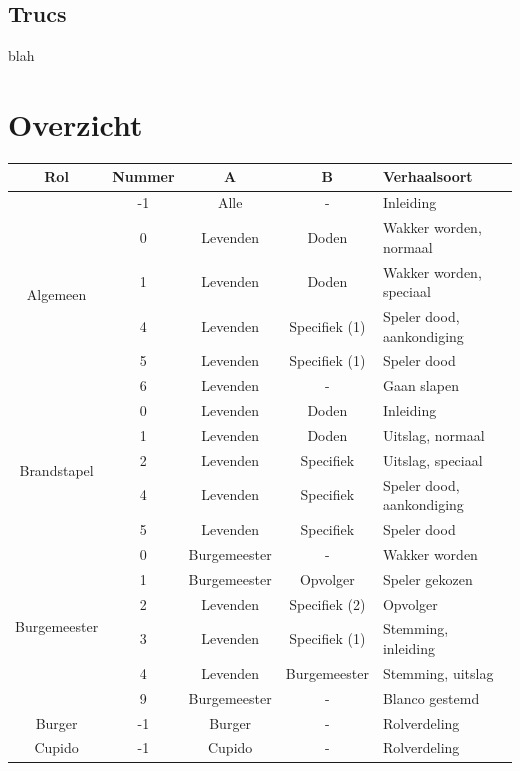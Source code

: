 \documentclass[12pt]{article}
\begin{document}
  \subsection{Trucs}
    
      blah

\section{Overzicht}

  \begin{center}
    \begin{longtable}{c|c|c|c|l}
      Rol & Nummer & A & B &Verhaalsoort \\
      \hline
      \hline
      \multirow{6}{*}{Algemeen} & -1 & Alle & - & Inleiding \\
       & 0 & Levenden & Doden & Wakker worden, normaal \\
       & 1 & Levenden & Doden & Wakker worden, speciaal \\
       & 4 & Levenden & Specifiek (1) & Speler dood, aankondiging \\
       & 5 & Levenden & Specifiek (1) & Speler dood \\
       & 6 & Levenden & - & Gaan slapen \\
      \hline
      \multirow{5}{*}{Brandstapel} & 0 & Levenden & Doden & Inleiding \\
       & 1 & Levenden & Doden & Uitslag, normaal \\
       & 2 & Levenden & Specifiek & Uitslag, speciaal \\
       & 4 & Levenden & Specifiek & Speler dood, aankondiging \\
       & 5 & Levenden & Specifiek & Speler dood \\
      \hline
      \multirow{6}{*}{Burgemeester} & 0 & Burgemeester & - & Wakker worden \\
       & 1 & Burgemeester & Opvolger & Speler gekozen \\
       & 2 & Levenden & Specifiek (2) & Opvolger \\
       & 3 & Levenden & Specifiek (1) & Stemming, inleiding \\
       & 4 & Levenden & Burgemeester & Stemming, uitslag \\
       & 9 & Burgemeester & - & Blanco gestemd \\
      \hline
      \multirow{1}{*}{Burger} & -1 & Burger & - & Rolverdeling \\
      \hline
      \multirow{8}{*}{Cupido} & -1 & Cupido & - & Rolverdeling \\

\end{longtable}
\end{center}
\end{document}
